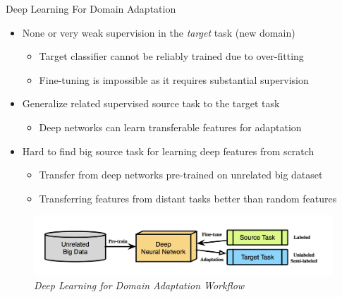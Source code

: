 \documentclass{beamer}
\begin{document}
\begin{frame}[fragile]{Deep Learning For Domain Adaptation}
\begin{itemize}
\item{None or very weak supervision in the \emph{target} task (new domain)}
  \begin{itemize}
  \item{Target classifier cannot be reliably trained due to over-fitting}
  \item{Fine-tuning is impossible as it requires substantial supervision}
  \end{itemize}
\item{Generalize related supervised source task to the target task}
  \begin{itemize}
  \item{Deep networks can learn transferable features for adaptation}
  \end{itemize}
\item{Hard to find big source task for learning deep features from scratch}
  \begin{itemize}
  \item{Transfer from deep networks pre-trained on unrelated big dataset}
  \item{Transferring features from distant tasks better than random features}
  \end{itemize}
\end{itemize}
\begin{figure}[h]
    \centering
    \includegraphics[width=1\textwidth]{fig1}
    \caption{\emph{Deep Learning for Domain Adaptation Workflow}}
    \label{fig:mesh2}
\end{figure}
\end{frame}
\end{document}
